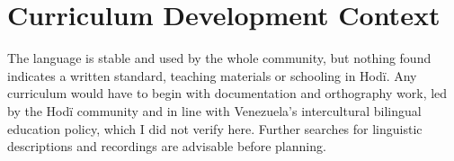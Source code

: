 \documentclass[12pt]{article}
\begin{document}
\section{Curriculum Development Context}
The language is stable and used by the whole community, but nothing found indicates a written standard, teaching materials or schooling in Hod\"i. Any curriculum would have to begin with documentation and orthography work, led by the Hod\"i community and in line with Venezuela's intercultural bilingual education policy, which I did not verify here. Further searches for linguistic descriptions and recordings are advisable before planning.
\end{document}
